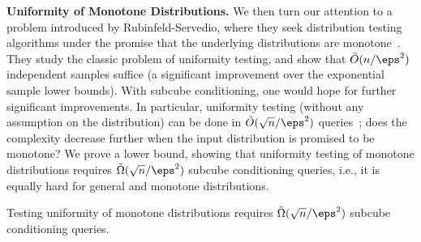 \noindent\textbf{Uniformity of Monotone Distributions.} We then turn our attention to a problem introduced by Rubinfeld-Servedio, where they seek distribution testing algorithms under the promise that the underlying distributions are monotone~\cite{RS09}. %
They study the classic problem of uniformity testing, and show that $\tilde{O}(n/\eps^2)$ independent samples suffice (a significant improvement over the exponential sample lower bounds). %
With subcube conditioning, one would hope for further significant improvements. In particular, uniformity testing (without any assumption on the distribution) can be done in $\tilde{O}(\sqrt{n}/\eps^2)$ queries~\cite{CCKLW21}; does the complexity decrease further when the input distribution is promised to be monotone?
We prove a lower bound, showing that uniformity testing of monotone distributions requires $\tilde{\Omega}(\sqrt{n}/\eps^2)$ subcube conditioning queries, i.e., it is equally hard for general and monotone distributions. %

\begin{theorem}\label{thm:uni-of-mon}
Testing uniformity of monotone distributions requires $\tilde{\Omega}(\sqrt{n}/\eps^2)$ subcube conditioning queries.
\end{theorem}

